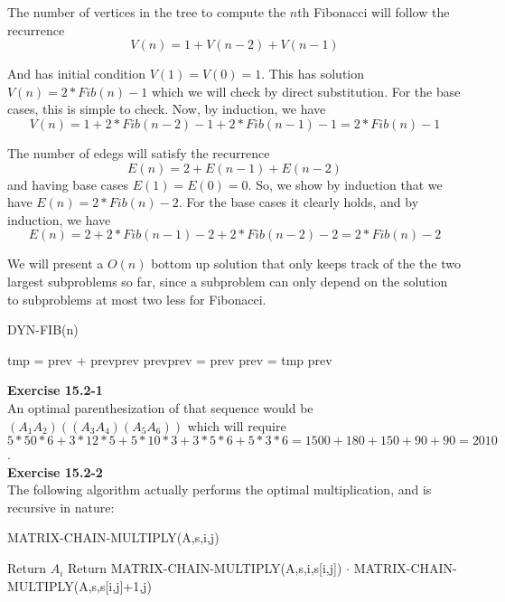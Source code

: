 \documentclass{article}
\begin{document}
The number of vertices in the tree to compute the $n$th Fibonacci will follow the recurrence
\[
V(n) = 1+  V(n-2) + V(n-1)
\]

And has initial condition $V(1) = V(0) = 1$. This has solution $V(n) = 2*Fib(n) -1$ which we will check by direct substitution. For the base cases, this is simple to check. Now, by induction, we have
\[
V(n) = 1 + 2*Fib(n-2) -1 + 2*Fib(n-1) -1 = 2*Fib(n) -1
\]

The number of edegs will satisfy the recurrence
\[
E(n) = 2 + E(n-1) + E(n-2)
\]
and having base cases $E(1)= E(0)= 0$. So, we show by induction that we have $E(n) = 2*Fib(n) -2$. For the base cases it clearly holds, and by induction, we have
\[
E(n) = 2 + 2*Fib(n-1) -2 + 2*Fib(n-2) -2 = 2*Fib(n)-2
\]



We will present a $O(n)$ bottom up solution that only keeps track of the the two largest subproblems so far, since a subproblem can only depend on the solution to subproblems at most two less for Fibonacci.\\

\begin{algorithm}
\caption{DYN-FIB(n)}
\begin{algorithmic}
\State {}
\EndIf
{}
\State tmp = prev + prevprev
\State prevprev = prev
\State prev = tmp
\EndFor
\State\Return prev
\end{algorithmic}
\end{algorithm}

\noindent\textbf{Exercise 15.2-1}\\

An optimal parenthesization of that sequence would be $(A_1 A_2)((A_3 A_4)(A_5A_6))$ which will require $5*50*6+3*12*5+5*10*3+3*5*6+5*3*6 = 1500 + 180 +150+90+90 = 2010$.\\

\noindent\textbf{Exercise 15.2-2}\\

The following algorithm actually performs the optimal multiplication, and is recursive in nature:

\begin{algorithm}
\caption{MATRIX-CHAIN-MULTIPLY(A,s,i,j)}
\begin{algorithmic}
	\State Return $A_i$
\EndIf
\State Return MATRIX-CHAIN-MULTIPLY(A,s,i,s[i,j]) $\cdot$ MATRIX-CHAIN-MULTIPLY(A,s,s[i,j]+1,j)
\end{algorithmic}
\end{algorithm}
\end{document}
